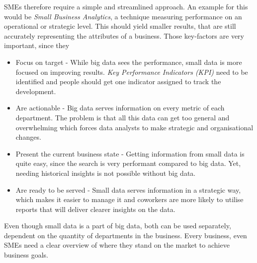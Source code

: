 \documentclass[../paper.tex]{subfiles}
\begin{document}
SMEs therefore require a simple and streamlined approach. An example for this would be \textit{Small Business Analytics}, a technique measuring performance on an operational or strategic level. This should yield smaller results, that are still accurately representing the attributes of a business. Those key-factors are very important, since they
\begin{itemize}
	\item Focus on target - While big data sees the performance, small data is more focused on improving results. \textit{Key Performance Indicators (KPI)} need to be identified and people should get one indicator assigned to track the development.
	\item Are actionable - Big data serves information on every metric of each department. The problem is that all this data can get too general and overwhelming which forces data analysts to make strategic and organisational changes.
	\item Present the current business state - Getting information from small data is quite easy, since the search is very performant compared to big data. Yet, needing historical insights is not possible without big data.
	\item Are ready to be served - Small data serves information in a strategic way, which makes it easier to manage it and coworkers are more likely to utilise reports that will deliver clearer insights on the data.
\end{itemize}
Even though small data is a part of big data, both can be used separately, dependent on the quantity of departments in the business. Every business, even SMEs need a clear overview of where they stand on the market to achieve business goals.~\cite{Durcevic2018}
\end{document}
